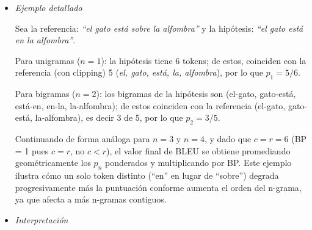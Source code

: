 \begin{itemize}
donde $\text{Count}_{\text{clip}}$ es el conteo de coincidencias recortado al máximo número de ocurrencias del n-grama en cualquier referencia. La penalización por brevedad se define como:

\begin{equation}
BP =
\begin{cases}
1 & \text{si } c > r \\
e^{(1 - r/c)} & \text{si } c \leq r
\end{cases}
\end{equation}

donde $c$ es la longitud de la hipótesis y $r$ es la longitud efectiva de la referencia (usualmente la de longitud más cercana a $c$). Finalmente, BLEU se calcula como:

\begin{equation}
\text{BLEU} = BP \cdot \exp\left(\sum_{n=1}^{N} w_n \log p_n\right)
\end{equation}

con $w_n$ los pesos asignados a cada orden de n-grama, típicamente uniformes ($w_n = 1/N$) \cite{papineni2002bleu}.

\item \textit{Ejemplo detallado} \\
\vspace{-0.5cm}

Sea la referencia: \textit{``el gato está sobre la alfombra''} y la hipótesis: \textit{``el gato está en la alfombra''}.

Para unigramas ($n=1$): la hipótesis tiene 6 tokens; de estos, coinciden con la referencia (con clipping) 5 (\textit{el, gato, está, la, alfombra}), por lo que $p_1 = 5/6$.

Para bigramas ($n=2$): los bigramas de la hipótesis son (el-gato, gato-está, está-en, en-la, la-alfombra); de estos coinciden con la referencia (el-gato, gato-está, la-alfombra), es decir 3 de 5, por lo que $p_2 = 3/5$.

Continuando de forma análoga para $n=3$ y $n=4$, y dado que $c = r = 6$ (BP = 1 pues $c = r$, no $c < r$), el valor final de BLEU se obtiene promediando geométricamente los $p_n$ ponderados y multiplicando por BP. Este ejemplo ilustra cómo un solo token distinto (``en'' en lugar de ``sobre'') degrada progresivamente más la puntuación conforme aumenta el orden del n-grama, ya que afecta a más n-gramas contiguos.

\item \textit{Interpretación} \\
\vspace{-0.5cm}


\end{itemize}
